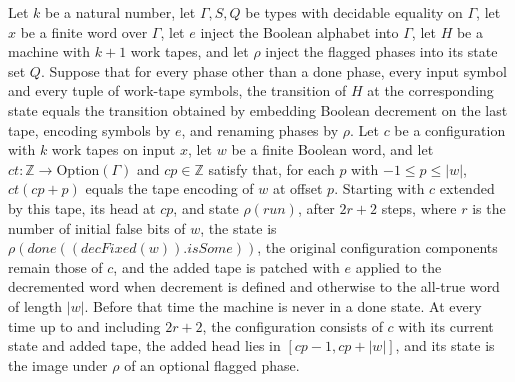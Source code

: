 \begin{theorem}
\label{Turing.sc_debit}
\leanok
{}
Let $k$ be a natural number, let $\Gamma,S,Q$ be types with decidable equality on
$\Gamma$, let $x$ be a finite word over $\Gamma$, let $e$ inject the Boolean alphabet
into $\Gamma$, let $H$ be a machine with $k+1$ work tapes, and let $\rho$ inject the
flagged phases into its state set $Q$. Suppose that for every phase other than a done
phase, every input symbol and every tuple of work-tape symbols, the transition of $H$ at
the corresponding state equals the transition obtained by embedding Boolean decrement on
the last tape, encoding symbols by $e$, and renaming phases by $\rho$. Let $c$ be a
configuration with $k$ work tapes on input $x$, let $w$ be a finite Boolean word, and
let $ct:\mathbb Z\to\mathrm{Option}(\Gamma)$ and $cp\in\mathbb Z$ satisfy that, for each
$p$ with $-1\le p\le |w|$, $ct(cp+p)$ equals the tape encoding of $w$ at offset $p$.
Starting with $c$ extended by this tape, its head at $cp$, and state $\rho(run)$, after
$2r+2$ steps, where $r$ is the number of initial false bits of $w$, the state is
$\rho(done((decFixed(w)).isSome))$, the original configuration components remain those
of $c$, and the added tape is patched with $e$ applied to the decremented word when
decrement is defined and otherwise to the all-true word of length $|w|$. Before that
time the machine is never in a done state. At every time up to and including $2r+2$, the
configuration consists of $c$ with its current state and added tape, the added head lies
in $[cp-1,cp+|w|]$, and its state is the image under $\rho$ of an optional flagged
phase.
\end{theorem}

